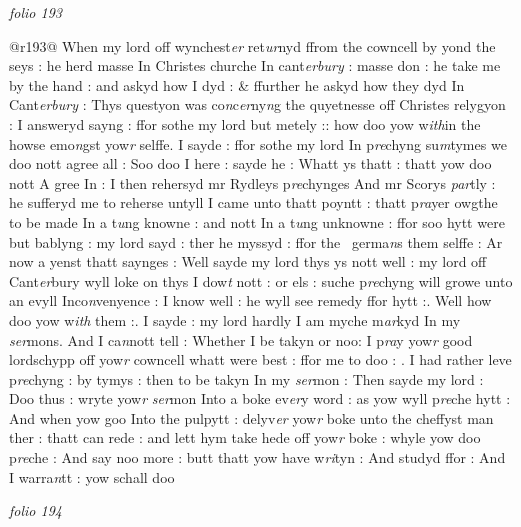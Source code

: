 \documentclass[12pt, a4paper]{book}
\begin{document}
\textit{folio 193}
      				
      				
      				
      				@r193@ When my lord off wynchest\textit{er} ret\textit{ur}nyd ffrom the cowncell by yond the seys : he herd masse In Christes churche In cant\textit{erbury} : masse don : he take me by the hand : and askyd how I dyd : \& ffurther he askyd how they dyd In Cant\textit{erbury} : Thys questyon was co\textit{n}c\textit{er}ny\textit{n}g the quyetnesse off Christes relygyon : I answeryd sayng : ffor sothe my lord but metely :: how doo yow w\textit{ith}in the howse emo\textit{n}gst yow\textit{r} selffe. I sayde : ffor sothe my lord In  p\textit{re}chyng su\textit{m}tymes we doo nott agree all : Soo doo I here : sayde he : Whatt ys thatt : thatt yow doo nott A gree In : I then rehersyd mr Rydleys p\textit{re}chynges And mr Scorys \textit{par}tly : he sufferyd me to reherse untyll I came unto thatt poyntt : thatt p\textit{ra}yer owgthe to be made In a t\textit{u}ng knowne : and nott In a t\textit{u}ng unknowne : ffor soo hytt were but bablyng : my lord sayd : ther he myssyd : ffor the  germa\textit{n}s them selffe : Ar now a yenst thatt saynges : Well sayde my lord thys ys nott well : my lord off Cant\textit{er}bury wyll loke on thys I dow\textit{t} nott : or els : suche p\textit{re}chyng will growe unto  an evyll Inco\textit{n}venyence : I know well : he wyll see remedy  ffor hytt :. Well how doo yow w\textit{ith} them :. I sayde : my lord hardly I am myche m\textit{ar}kyd In my \textit{ser}mons. And I ca\textit{n}nott tell : Whether I be takyn or noo: I p\textit{ra}y yow\textit{r} good lordschypp off yow\textit{r} cowncell whatt were best : ffor me to doo : . I had rather leve p\textit{re}chyng : by tymys : then to be takyn In my \textit{ser}mon : Then sayde my lord : Doo  thus : wryte yow\textit{r}
      				\textit{ser}mon Into a boke ev\textit{er}y word : as yow wyll p\textit{re}che hytt : And when yow goo Into the pulpytt : delyv\textit{er} yow\textit{r} boke unto  the cheffyst man ther : thatt can rede : and lett hym take hede off yow\textit{r} boke : whyle yow doo p\textit{re}che : And say noo more : butt thatt yow have w\textit{ri}tyn : And studyd ffor : And I warra\textit{n}tt : yow schall doo
      				
\dotfill
					

\textit{folio 194}
      				
\end{document}
